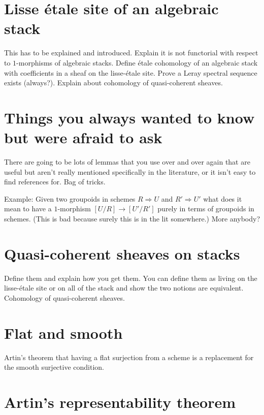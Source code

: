 \section{Lisse \'etale site of an algebraic stack}
\label{section-lisse-etale}

\noindent
This has to be explained and introduced. Explain it is not functorial with
respect to $1$-morphisms of algebraic stacks. Define \'etale cohomology of an
algebraic stack with coefficients in a sheaf on the lisse-\'etale site.
Prove a Leray spectral sequence exists (always?). Explain about cohomology
of quasi-coherent sheaves.

\section{Things you always wanted to know but were afraid to ask}
\label{section-stacks-fun-lemmas}

\noindent
There are going to be lots of lemmas that you use over and over again
that are useful but aren't really mentioned specifically in the literature,
or it isn't easy to find references for. Bag of tricks.

\medskip\noindent
Example: Given two groupoids in schemes $R\Rightarrow U$ and
$R' \Rightarrow U'$ what does it mean to have a $1$-morphism
$[U/R] \to [U'/R']$ purely in terms of groupoids in schemes.
(This is bad because surely this is in the lit somewhere.)
More anybody?

\section{Quasi-coherent sheaves on stacks}
\label{section-quasi-coherent}

\noindent
Define them and explain how you get them. You can define them as living on the
lisse-\'etale site or on all of the stack and show the two notions are
equivalent. Cohomology of quasi-coherent sheaves.


\section{Flat and smooth}
\label{section-flat-smooth}

\noindent
Artin's theorem that having a flat surjection from a scheme is a replacement
for the smooth surjective condition.


\section{Artin's representability theorem}
\label{section-representability}

